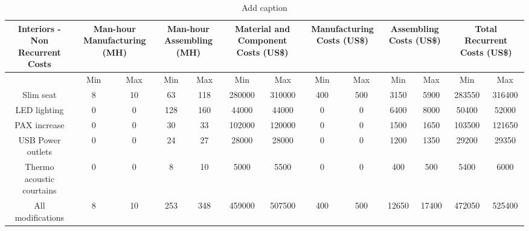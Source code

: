 \begin{table}[htbp]
  \centering
  \caption{Add caption}
    \begin{tabular}{ccccccccccccc}
    \toprule
    \multirow{2}[4]{*}{Interiors - Non Recurrent Costs} & \multicolumn{2}{c}{Man-hour Manufacturing (MH)} & \multicolumn{2}{c}{Man-hour Assembling (MH)} & \multicolumn{2}{c}{Material and Component Costs (US\$)} & \multicolumn{2}{c}{Manufacturing Costs (US\$)} & \multicolumn{2}{c}{Assembling Costs (US\$)} & \multicolumn{2}{c}{Total Recurrent Costs (US\$)} \\
    \midrule
          & Min   & Max   & Min   & Max   & Min   & Max   & Min   & Max   & Min   & Max   & Min   & Max \\
    Slim seat & 8     & 10    & 63    & 118   & 280000 & 310000 & 400   & 500   & 3150  & 5900  & 283550 & 316400 \\
    LED lighting & 0     & 0     & 128   & 160   & 44000 & 44000 & 0     & 0     & 6400  & 8000  & 50400 & 52000 \\
    PAX increase & 0     & 0     & 30    & 33    & 102000 & 120000 & 0     & 0     & 1500  & 1650  & 103500 & 121650 \\
    USB Power outlets & 0     & 0     & 24    & 27    & 28000 & 28000 & 0     & 0     & 1200  & 1350  & 29200 & 29350 \\
    Thermo acoustic courtains & 0     & 0     & 8     & 10    & 5000  & 5500  & 0     & 0     & 400   & 500   & 5400  & 6000 \\
    All modifications & 8     & 10    & 253   & 348   & 459000 & 507500 & 400   & 500   & 12650 & 17400 & 472050 & 525400 \\
    \bottomrule
    \end{tabular}%
  \label{tab:addlabel}%
\end{table}%

